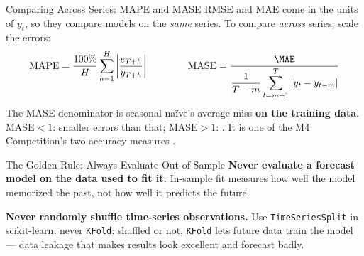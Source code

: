 \documentclass[aspectratio=169, 11pt]{beamer}
\begin{document}
\begin{frame}{Comparing Across Series: MAPE and MASE}
  RMSE and MAE come in the units of $y_t$, so they compare models on the
  \emph{same} series. To compare \emph{across} series, scale the errors:
  \[
    \text{MAPE} = \frac{100\%}{H}\sum_{h=1}^{H}
                  \left|\frac{e_{T+h}}{y_{T+h}}\right|
    \qquad\qquad
    \text{MASE} = \frac{\MAE}{\displaystyle\frac{1}{T-m}\sum_{t=m+1}^{T} |y_t - y_{t-m}|}
  \]
  The MASE denominator is seasonal na\"{i}ve's average miss \textbf{on the
  training data}. $\text{MASE} < 1$: smaller errors than that;
  $\text{MASE} > 1$: . It is one of the M4 Competition's two
  accuracy measures \parencite{Makridakis2020}.

  \vspace{0.15cm}
\end{frame}

\begin{frame}{The Golden Rule: Always Evaluate Out-of-Sample}
  \textbf{Never evaluate a forecast model on the data used to fit it.}
  In-sample fit measures how well the model memorized the past, not how well
  it predicts the future.
  \begin{center}
  \end{center}
  \begin{warningbox}
    \textbf{Never randomly shuffle time-series observations.} Use
    \texttt{TimeSeriesSplit} in scikit-learn, never \texttt{KFold}: shuffled or
    not, \texttt{KFold} lets future data train the model --- data leakage that
    makes results look excellent and forecast badly.
  \end{warningbox}
\end{frame}
\end{document}
